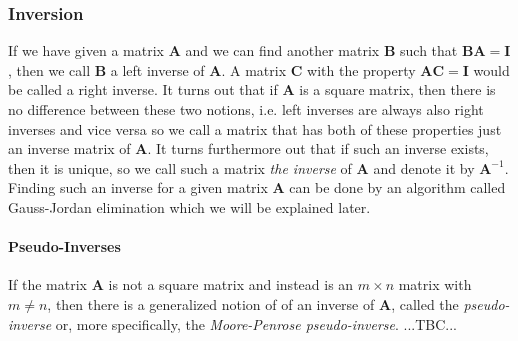 




\subsubsection{Inversion}
If we have given a matrix $\mathbf{A}$ and we can find another matrix $\mathbf{B}$ such that  $\mathbf{B} \mathbf{A} = \mathbf{I}$, then we call $\mathbf{B}$ a left inverse of $\mathbf{A}$. A matrix $\mathbf{C}$ with the property $\mathbf{A} \mathbf{C} = \mathbf{I}$ would be called a right inverse. It turns out that if $\mathbf{A}$ is a square matrix, then there is no difference between these two notions, i.e. left inverses are always also right inverses and vice versa so we call a matrix that has both of these properties just an inverse matrix of $\mathbf{A}$. It turns furthermore out that if such an inverse exists, then it is unique, so we call such a matrix \emph{the inverse} of $\mathbf{A}$ and denote it by $\mathbf{A}^{-1}$. Finding such an inverse for a given matrix $\mathbf{A}$ can be done by an algorithm called Gauss-Jordan elimination which we will be explained later.

\paragraph{Pseudo-Inverses}
If the matrix $\mathbf{A}$ is not a square matrix and instead is an $m \times n$ matrix with $m \neq n$, then there is a generalized notion of of an inverse of $\mathbf{A}$, called the \emph{pseudo-inverse} or, more specifically, the \emph{Moore-Penrose pseudo-inverse}. ...TBC...

